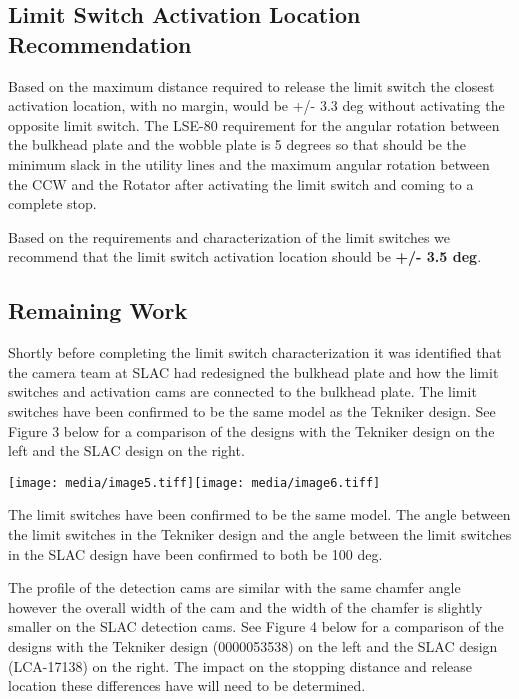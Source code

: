 \documentclass[SE,lsstdraft,authoryear,toc]{lsstdoc}
\begin{document}
\hypertarget{limit-switch-activation-location-recommendation}{%
\subsection{Limit Switch Activation Location
Recommendation}\label{limit-switch-activation-location-recommendation}}

Based on the maximum distance required to release the limit switch the
closest activation location, with no margin, would be +/- 3.3 deg
without activating the opposite limit switch. The LSE-80 requirement for
the angular rotation between the bulkhead plate and the wobble plate is
5 degrees so that should be the minimum slack in the utility lines and
the maximum angular rotation between the CCW and the Rotator after
activating the limit switch and coming to a complete stop.

Based on the requirements and characterization of the limit switches we
recommend that the limit switch activation location should be
\textbf{+/- 3.5 deg}.

\hypertarget{remaining-work}{%
\subsection{Remaining Work}\label{remaining-work}}

Shortly before completing the limit switch characterization it was
identified that the camera team at SLAC had redesigned the bulkhead
plate and how the limit switches and activation cams are connected to
the bulkhead plate. The limit switches have been confirmed to be the
same model as the Tekniker design. See Figure 3 below for a comparison
of the designs with the Tekniker design on the left and the SLAC design
on the right.

\texttt{[image: media/image5.tiff]}\texttt{[image: media/image6.tiff]}

The limit switches have been confirmed to be the same model. The angle
between the limit switches in the Tekniker design and the angle between
the limit switches in the SLAC design have been confirmed to both be 100
deg.

The profile of the detection cams are similar with the same chamfer
angle however the overall width of the cam and the width of the chamfer
is slightly smaller on the SLAC detection cams. See Figure 4 below for a
comparison of the designs with the Tekniker design (0000053538) on the
left and the SLAC design (LCA-17138) on the right. The impact on the
stopping distance and release location these differences have will need
to be determined.
\end{document}
